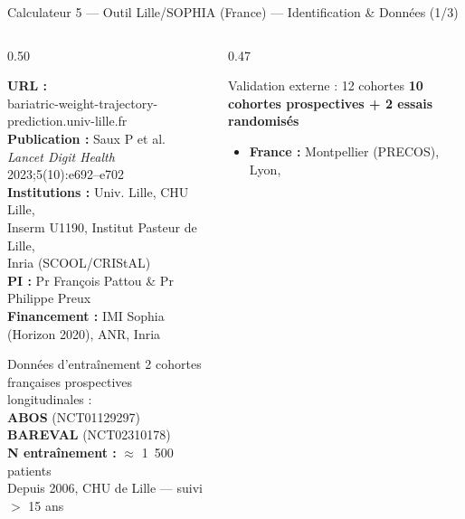 \documentclass[aspectratio=169]{beamer}
\newcommand{\tightlist}{%
  \setlength{\itemsep}{1pt}\setlength{\parskip}{0pt}%
  \setlength{\parsep}{0pt}\setlength{\topsep}{2pt}}
\begin{document}
\begin{frame}{Calculateur 5 --- Outil Lille/SOPHIA (France) --- Identification \& Données (1/3)}
  \begin{columns}[T]
    \begin{column}{0.50\textwidth}
      \begin{tcolorbox}[colback=violetpale,colframe=violetdoux,
        title={\small\textbf{Premier outil bariatrique français en ligne}},
        fonttitle=\bfseries\small,top=3pt,bottom=3pt]
        \footnotesize
        \textbf{URL :}\\
        bariatric-weight-trajectory-prediction.univ-lille.fr\\[4pt]
        \textbf{Publication :} Saux P et al.\\
        \textit{Lancet Digit Health} 2023;5(10):e692--e702\\[4pt]
        \textbf{Institutions :} Univ. Lille, CHU Lille,\\
        Inserm U1190, Institut Pasteur de Lille,\\
        Inria (SCOOL/CRIStAL)\\[4pt]
        \textbf{PI :} Pr François Pattou \& Pr Philippe Preux\\[4pt]
        \textbf{Financement :} IMI Sophia (Horizon 2020), ANR, Inria
      \end{tcolorbox}
      \vspace{0.3em}
      \begin{block}{Données d'entraînement}
        \footnotesize
        2 cohortes françaises prospectives longitudinales :\\[4pt]
        \textbf{ABOS} (NCT01129297)\\
        \textbf{BAREVAL} (NCT02310178)\\[4pt]
        \textbf{N entraînement :} $\approx$ 1~500 patients\\
        Depuis 2006, CHU de Lille --- suivi $>$ 15 ans
      \end{block}
    \end{column}
    \begin{column}{0.47\textwidth}
      \begin{block}{Validation externe : 12 cohortes}
        \footnotesize
        \textbf{10 cohortes prospectives + 2 essais randomisés}\\[4pt]
        \begin{itemize}\tightlist
          \item \textbf{France :} Montpellier (PRECOS), Lyon,\\

\end{itemize}
\end{block}
\end{column}
\end{columns}
\end{frame}
\end{document}
